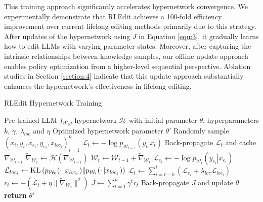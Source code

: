 This training approach significantly accelerates hypernetwork convergence. We experimentally demonstrate that RLEdit achieves a 100-fold efficiency improvement over current lifelong editing methods primarily due to this strategy. After updates of the hypernetwork using $J$ in Equation \ref{equ:3}, it gradually learns how to edit LLMs with varying parameter states. Moreover, after capturing the intrinsic relationships between knowledge samples, our offline update approach enables policy optimization from a higher-level sequential perspective. Ablation studies in Section \ref{section:4} indicate that this update approach substantially enhances the hypernetwork's effectiveness in lifelong editing.

\begin{algorithm}[t]
   \caption{RLEdit Hypernetwork Training}
   \label{alg:train}
\begin{algorithmic}
    Pre-trained LLM $f_{\mathcal{W}_0}$, hypernetwork $\mathcal{H}$ with initial parameter $\theta$, hyperparameters $k$, $\gamma$, $\lambda_{\mathit{loc}}$ and $\eta$
    Optimized hypernetwork parameter $\theta'$
   \REPEAT
   \STATE Randomly sample $(x_i,y_i,x_{e_i},y_{e_i},x_{\mathit{loc}_i})_{i=1}^n$
   \STATE $\mathcal{L}_t\leftarrow -\log{p_{\mathcal{W}_{t-1}}\left(y_t\left|x_t\right.\right)}$
   \STATE Back-propagate $\mathcal{L}_t$ and cache $\nabla_{\mathcal{W}_{t-1}}$
   \STATE $\tilde{\nabla}_{\mathcal{W}_t}\leftarrow \mathcal{H}(\nabla_{\mathcal{W}_{t-1}})$
   \STATE $\mathcal{W}_t\leftarrow \mathcal{W}_{t-1}+\tilde{\nabla}_{\mathcal{W}_t}$
   \STATE $\mathcal{L}_{e_i}\leftarrow -\log{p_{\mathcal{W}_{t}}\left(y_{e_i}\left|x_{e_i}\right.\right)}$
   \STATE $\mathcal{L}_{{loc}_i}\leftarrow \textsc{KL}\left(p_{\mathcal{W}_0}(\cdot\left|x_{\mathit{loc}_i}\right.)\|p_{\mathcal{W}_{t}}(\cdot\left|x_{\mathit{loc}_i}\right.)\right)$
   \ENDFOR
   \STATE $\mathcal{L}_t\leftarrow \sum_{i=t-k}^{t}\left(\mathcal{L}_{e_i}+\lambda_{\mathit{loc}}\mathcal{L}_{\mathit{loc}_{i}}\right)$
   \STATE $r_t\leftarrow -(\mathcal{L}_t+\eta\|\tilde{\nabla}_{\mathcal{W}_t}\|^2)$
   \ENDFOR
   \STATE $J\leftarrow \sum_{t=1}^n\gamma^t{r_t}$
   \STATE Back-propagate $J$ and update $\theta$
   \\
   \STATE \textbf{return} $\theta'$
\end{algorithmic}
\end{algorithm}


